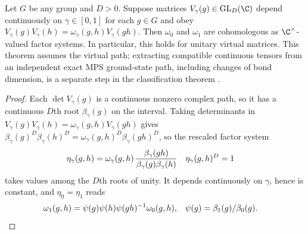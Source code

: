 \begin{lemma}
    \label{thm:spt_virtual_path_class_invariance}
    \leanok
    Let $G$ be any group and $D>0$. Suppose matrices
    $V_\gamma(g)\in\mathrm{GL}_D(\C)$ depend continuously on
    $\gamma\in[0,1]$ for each $g\in G$ and obey
    $V_\gamma(g)V_\gamma(h)=\omega_\gamma(g,h)V_\gamma(gh)$.
    Then $\omega_0$ and $\omega_1$ are cohomologous as
    $\C^\times$-valued factor systems. In particular, this holds for
    unitary virtual matrices. This theorem assumes the
    virtual path; extracting compatible continuous tensors from an
    independent exact MPS ground-state path, including changes of
    bond dimension, is a separate step in the classification theorem
    \cite[Section~II.F.2, lines~930--946]{Schuch2011Phases}.
\end{lemma}

\begin{proof}\leanok
    Each $\det V_\gamma(g)$ is a continuous nonzero complex path, so it
    has a continuous $D$th root $\beta_\gamma(g)$ on the interval.
    Taking determinants in $V_\gamma(g)V_\gamma(h)=\omega_\gamma(g,h)V_\gamma(gh)$
    gives $\beta_\gamma(g)^D\beta_\gamma(h)^D=\omega_\gamma(g,h)^D\beta_\gamma(gh)^D$,
    so the rescaled factor system
    \begin{align}
        \eta_\gamma(g,h)
         & =\omega_\gamma(g,h)\,\frac{\beta_\gamma(gh)}{\beta_\gamma(g)\beta_\gamma(h)}
         &
        \eta_\gamma(g,h)^D
         & =1
        \notag
    \end{align}
    takes values among the $D$th roots of unity.  It depends continuously on
    $\gamma$, hence is constant, and $\eta_0=\eta_1$ reads
    \begin{align}
        \omega_1(g,h)
         & =\psi(g)\psi(h)\psi(gh)^{-1}\omega_0(g,h),
         &
        \psi(g)
         & =\beta_1(g)/\beta_0(g).
        \notag
    \end{align}
\end{proof}

